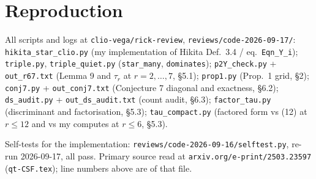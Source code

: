 \documentclass[11pt]{article}
\begin{document}
\section{Reproduction}
All scripts and logs at \texttt{clio-vega/rick-review},
\texttt{reviews/code-2026-09-17/}: \texttt{hikita\_star\_clio.py} (my implementation of Hikita
Def.\ 3.4 / eq.\ \texttt{Eqn\_Y\_i}); \texttt{triple.py}, \texttt{triple\_quiet.py}
(\texttt{star\_many}, \texttt{dominates}); \texttt{p2Y\_check.py} + \texttt{out\_r67.txt}
(Lemma 9 and $\tau_r$ at $r=2,\dots,7$, \S5.1); \texttt{prop1.py} (Prop.\ 1 grid, \S2);
\texttt{conj7.py} + \texttt{out\_conj7.txt} (Conjecture 7 diagonal and exactness, \S6.2);
\texttt{ds\_audit.py} + \texttt{out\_ds\_audit.txt} (count audit, \S6.3);
\texttt{factor\_tau.py} (discriminant and factorisation, \S5.3); \texttt{tau\_compact.py}
(factored form vs (12) at $r\le12$ and vs my computes at $r\le6$, \S5.3).

Self-tests for the implementation: \texttt{reviews/code-2026-09-16/selftest.py}, re-run
2026-09-17, all pass. Primary source read at \texttt{arxiv.org/e-print/2503.23597}
(\texttt{qt-CSF.tex}); line numbers above are of that file.
\end{document}
